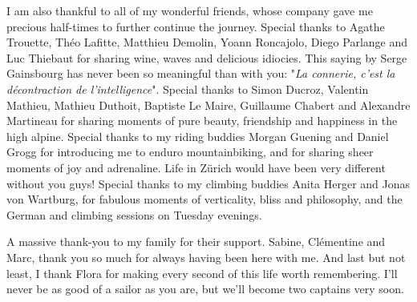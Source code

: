 I am also thankful to all of my wonderful friends, whose company gave me precious half-times to further continue the journey.
% 
Special thanks to Agathe Trouette, Théo Lafitte, Matthieu Demolin, Yoann Roncajolo, Diego Parlange and Luc Thiebaut for sharing wine, waves and delicious idiocies. This saying by Serge Gainsbourg has never been so meaningful than with you: "\textit{La connerie, c'est la décontraction de l'intelligence}".
% 
Special thanks to Simon Ducroz, Valentin Mathieu, Mathieu Duthoit, Baptiste Le Maire, Guillaume Chabert and Alexandre Martineau for sharing moments of pure beauty, friendship and happiness in the high alpine.
% 
Special thanks to my riding buddies Morgan Guening and Daniel Grogg for introducing me to enduro mountainbiking, and for sharing sheer moments of joy and adrenaline. Life in Zürich would have been very different without you guys! 
% 
Special thanks to my climbing buddies Anita Herger and Jonas von Wartburg, for fabulous moments of verticality, bliss and philosophy, and the German and climbing sessions on Tuesday evenings.

A massive thank-you to my family for their support. Sabine, Clémentine and Marc, thank you so much for always having been here with me. 
% 
And last but not least, I thank Flora for making every second of this life worth remembering.
% 
I'll never be as good of a sailor as you are, but we'll become two captains very soon.

















